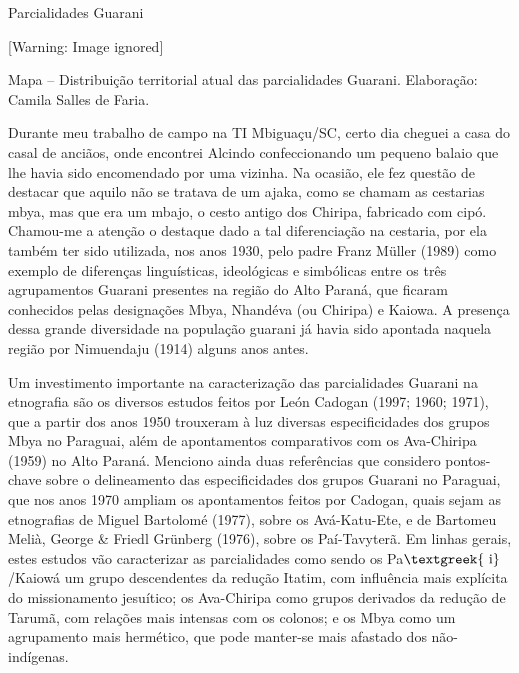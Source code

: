 \documentclass{article}
\newcounter{Mapa}
\renewcommand\theMapa{\arabic{Mapa}}
\begin{document}
Parcialidades Guarani

  [Warning: Image ignored] %
 

Mapa \stepcounter{Mapa}{\theMapa} -- Distribui\c{c}\~ao territorial
atual das parcialidades Guarani. Elabora\c{c}\~ao: Camila Salles de
Faria.

Durante meu trabalho de campo na TI Mbigua\c{c}u/SC, certo dia cheguei a
casa do casal de anci\~aos, onde encontrei Alcindo confeccionando um
pequeno balaio que lhe havia sido encomendado por uma vizinha. Na
ocasi\~ao, ele fez quest\~ao de destacar que aquilo n\~ao se tratava de
um ajaka, como se chamam as cestarias mbya, mas que era um mbajo, o
cesto antigo dos Chiripa, fabricado com cip\'o. Chamou-me a
aten\c{c}\~ao o destaque dado a tal diferencia\c{c}\~ao na cestaria,
por ela tamb\'em ter sido utilizada, nos anos 1930, pelo padre Franz
M\"uller (1989) como exemplo de diferen\c{c}as lingu\'isticas,
ideol\'ogicas e simb\'olicas entre os tr\^es agrupamentos Guarani
presentes na regi\~ao do Alto Paran\'a, que ficaram conhecidos pelas
designa\c{c}\~oes Mbya, Nhand\'eva (ou Chiripa) e Kaiowa. A
presen\c{c}a dessa grande diversidade na popula\c{c}\~ao guarani j\'a
havia sido apontada naquela regi\~ao por Nimuendaju (1914) alguns anos
antes.

Um investimento importante na caracteriza\c{c}\~ao das parcialidades
Guarani na etnografia s\~ao os diversos estudos feitos por Le\'on
Cadogan (1997; 1960; 1971), que a partir dos anos 1950 trouxeram \`a
luz diversas especificidades dos grupos Mbya no Paraguai, al\'em de
apontamentos comparativos com os Ava-Chiripa (1959) no Alto Paran\'a.
Menciono ainda duas refer\^encias que considero pontos-chave sobre o
delineamento das especificidades dos grupos Guarani no Paraguai, que
nos anos 1970 ampliam os apontamentos feitos por Cadogan, quais sejam
as etnografias de Miguel Bartolom\'e (1977), sobre os Av\'a-Katu-Ete, e
de Bartomeu Meli\`a, George \& Friedl Gr\"unberg (1976), sobre os
Pa\'i-Tavyter\~a. Em linhas gerais, estes estudos v\~ao caracterizar as
parcialidades como sendo os Pa$\text{\textgreek{~i}}$/Kaiow\'a um grupo
descendentes da redu\c{c}\~ao Itatim, com influ\^encia mais expl\'icita
do missionamento jesu\'itico; os Ava-Chiripa como grupos derivados da
redu\c{c}\~ao de Tarum\~a, com rela\c{c}\~oes mais intensas com os
colonos; e os Mbya como um agrupamento mais herm\'etico, que pode
manter-se mais afastado dos n\~ao-ind\'igenas. 
\end{document}
